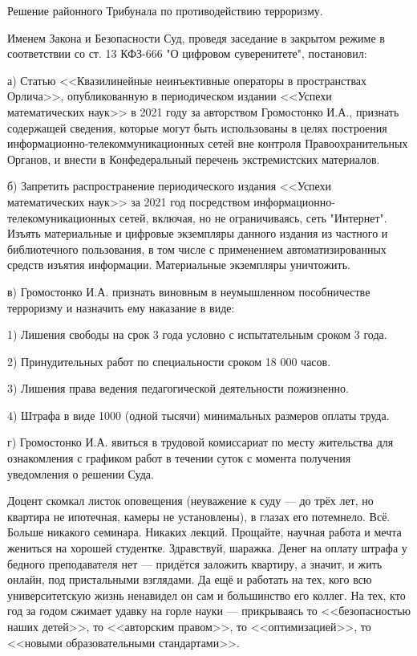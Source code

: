 Решение районного Трибунала по противодействию терроризму.

Именем Закона и Безопасности Суд,
проведя заседание в закрытом режиме в соответствии со ст. 13 КФЗ-666 "О цифровом суверенитете", постановил:

а) Статью <<Квазилинейные неинъективные операторы в пространствах Орлича>>,
опубликованную в периодическом издании <<Успехи математических наук>> в 2021 году за авторством Громостонко И.А.,
признать содержащей сведения,
которые могут быть использованы в целях построения информационно-телекоммуникационных сетей вне контроля
Правоохранительных Органов, и внести в Конфедеральный перечень экстремистских материалов.

б) Запретить распространение периодического издания <<Успехи математических наук>>
за 2021 год посредством информационно-телекомуникационных сетей, включая, но не ограничиваясь, сеть "Интернет".
Изъять материальные и цифровые экземпляры данного издания из частного и библиотечного пользования,
в том числе с применением автоматизированных средств изъятия информации. Материальные экземпляры уничтожить.

в) Громостонко И.А. признать виновным в неумышленном пособничестве терроризму и назначить ему наказание в виде:

1) Лишения свободы на срок 3 года условно с испытательным сроком 3 года.

2) Принудительных работ по специальности сроком 18 000 часов.

3) Лишения права ведения педагогической деятельности пожизненно.

4) Штрафа в виде 1000 (одной тысячи) минимальных размеров оплаты труда.

г) Громостонко И.А. явиться в трудовой комиссариат по месту жительства
для ознакомления с графиком работ в течении суток с момента получения уведомления о решении Суда.

\emptypar

Доцент скомкал листок оповещения (неуважение к суду --- до трёх лет, но квартира не ипотечная, камеры не установлены),
в глазах его потемнело. Всё. Больше никакого семинара. Никаких лекций.
Прощайте, научная работа и мечта жениться на хорошей студентке. Здравствуй, шаражка.
Денег на оплату штрафа у бедного преподавателя нет --- придётся заложить квартиру, а значит, и жить онлайн,
под пристальными взглядами. Да ещё и работать на тех, кого всю университетскую жизнь ненавидел он сам и большинство его коллег.
На тех, кто год за годом сжимает удавку на горле науки --- прикрываясь то <<безопасностью наших детей>>,
то <<авторским правом>>, то <<оптимизацией>>, то <<новыми образовательными стандартами>>.

